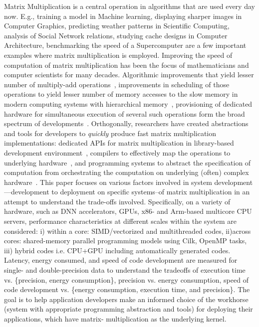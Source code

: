 Matrix Multiplication is a central operation in algorithms that are used every day now. E.g., training a model in Machine learning, displaying sharper images in Computer Graphics, predicting weather patterns in Scientific Computing, analysis of Social Network relations, studying cache designs in Computer Architecture, benchmarking the speed of a Supercomputer are a few important examples where matrix multiplication is employed. Improving the speed of computation of matrix multiplication has been the focus of mathematicians and computer scientists for many decades. Algorithmic improvements that yield lesser number of multiply-add operations~\cite{huss1996implementation}, improvements in scheduling of those operations to yield lesser number of memory accesses to the slow memory in modern computing systems with hierarchical memory~\cite{low2004api,van1997summa}, provisioning of dedicated hardware for simultaneous execution of several such operations form the broad spectrum of developments~\cite{10.1137/140993478}. Orthogonally, researchers have created abstractions and tools for developers to {\em quickly} produce fast matrix multiplication implementations: dedicated APIs for matrix multiplication in library-based development environment~\cite{MKL,Alpatov1997PLAPACKPL,goto2008high,choi1992scalapack,anderson1999lapack,libflame}, compilers to effectively map the operations to underlying hardware~\cite{ikarashi2022exocompilation}, and programming systems to abstract the specification of computation from orchestrating the computation on underlying (often) complex hardware~\cite{ragan2013halide}. This paper focuses on various factors 
 involved in system development ---development to deployment on specific systems--of matrix multiplication in an attempt to understand the trade-offs involved. Specifically, on a variety of hardware, such as DNN accelerators, GPUs, x86- and Arm-based multicore CPU servers, performance characteristics at different scales within the system are considered: i) within a core: SIMD/vectorized and multithreaded codes, ii)across cores: shared-memory parallel programming models using Cilk, OpenMP tasks, iii) hybrid codes i.e. CPU+GPU including automatically generated codes. Latency, energy consumed, and  speed of code development are measured for single- and double-precision data to understand the tradeoffs of execution time vs. \{precision, energy consumption\}, precision vs. energy consumption, speed of code development vs. \{energy consumption, execution time, and precision\}. The goal is to help application developers make an informed choice of the workhorse (system with appropriate programming abstraction and tools) for deploying their applications, which have matrix- multiplication as the underlying kernel. 
 
